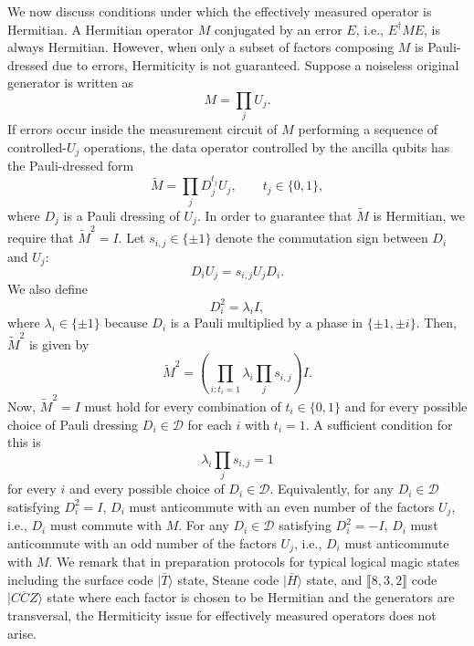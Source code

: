 \documentclass[
 reprint,
 amsmath,amssymb,
 pra,superscriptaddress, nofootinbib
]{revtex4-2}
\theoremstyle{definition}
\theoremstyle{plain}
\begin{document}
We now discuss conditions under which the effectively measured operator is Hermitian.
A Hermitian operator $M$ conjugated by an error $E$, i.e., $E^\dagger ME$, is always Hermitian. However, when only a subset of factors composing $M$ is Pauli-dressed due to errors, Hermiticity is not guaranteed.
Suppose a noiseless original generator is written as
\begin{equation}
  M = \prod_j U_j.
\end{equation}
If errors occur inside the measurement circuit of $M$ performing a sequence of controlled-$U_j$ operations, the data operator controlled by the ancilla qubits has the Pauli-dressed form
\begin{equation}
  \tilde{M} = \prod_j D_j^{t_j}U_j, \qquad t_j \in \{0,1 \},
  \label{eq:each_factor_dressing}
\end{equation}
where $D_j$ is a Pauli dressing of $U_j$.
In order to guarantee that $\tilde{M}$ is Hermitian, we require that $\tilde{M}^2=I$. Let $s_{i,j} \in \{ \pm1\}$ denote the commutation sign between $D_i$ and $U_j$:
\begin{equation}
  D_i U_j=s_{i,j} U_j D_i.
\end{equation}
We also define 
\begin{equation}
  D_i^2=\lambda_i I, 
\end{equation}
where $\lambda_i \in \{\pm1\}$ because $D_i$ is a Pauli multiplied by a phase in $\{ \pm 1, \pm i\}$.
Then, $\tilde{M}^2$ is given by
\begin{equation}
  \tilde{M}^2 = \left (\prod_{i:t_i=1} \lambda_i \prod_j s_{i,j} \right)I.
\end{equation}
Now, $\tilde{M}^2=I$ must hold for every combination of $t_i \in \{0,1\}$ and for every possible choice of Pauli dressing $D_i \in \mathcal{D}$ for each $i$ with $t_i=1$.
A sufficient condition for this is
\begin{equation}
  \lambda_i \prod_j s_{i,j}=1
  \label{eq:effective_herm}
\end{equation}
for every $i$ and every possible choice of $D_i \in \mathcal{D}$.
Equivalently, for any $D_i \in \mathcal{D}$ satisfying $D_i^2=I$, $D_i$ must anticommute with an even number of the factors $U_j$, i.e., $D_i$ must commute with $M$.
For any $D_i \in \mathcal{D}$ satisfying $D_i^2=-I$, $D_i$ must anticommute with an odd number of the factors $U_j$, i.e., $D_i$ must anticommute with $M$.
We remark that in preparation protocols for typical logical magic states including the surface code $|\bar{T}\rangle$ state, Steane code $|\bar{H}\rangle$ state, and $\llbracket 8,3,2 \rrbracket$ code $|\overline{CCZ}\rangle$ state where each factor is chosen to be Hermitian and the generators are transversal, the Hermiticity issue for effectively measured operators does not arise.
\end{document}
